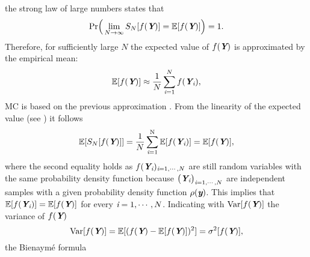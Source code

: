 the strong law of large numbers states that
\begin{equation}
\textrm{Pr}\Big(\lim_{N\rightarrow\infty}S_{N}[f(\textit{\textbf{Y}})] = \mathbb{E}[f(\textit{\textbf{Y}})] \Big) = 1.
\end{equation}
Therefore, for sufficiently large $N$ the expected value of $f(\textit{\textbf{Y}})$ is approximated by the empirical mean:
\begin{equation}\label{eq:approx_MC_QMC}
\mathbb{E}[f(\textit{\textbf{Y}})] \approx \frac{1}{N} \sum_{\textit{i}=1}^{N} f(\textit{\textbf{Y}}_{\textit{i}}),
\end{equation}
MC is based on the previous approximation \cite{owen2003quasi}. From the linearity of the expected value (see \cite{grinstead2012introduction})
 it follows
\begin{equation}\label{eq:linearity}
\mathbb{E}[S_{N}[f(\textit{\textbf{Y}})]] = \frac{1}{N}\sum_{\textit{i}=1}^{\textrm{N}}\mathbb{E}[f(\textit{\textbf{Y}}_{\textit{i}})] = \mathbb{E}[f(\textit{\textbf{Y}})],
\end{equation}
where the second equality holds as
$f(\textit{\textbf{Y}}_{\textit{i}})_{\textit{i}=1, \cdots, N}$ are still random variables with the same probability density function because $\big(\textit{\textbf{Y}}_{\textit{i}}\big)_{\textit{i}=1, \cdots, N}$ are independent samples 
with a given probability density function $\rho(\textit{\textbf{y}})$. This implies that $\mathbb{E}[f(\textit{\textbf{Y}}_{\textit{i}})] = \mathbb{E}[f(\textit{\textbf{Y}})]$ for every $\textit{i}=1, \cdots, N$. Indicating with $\textrm{Var}[f(\textit{\textbf{Y}})]$ the variance of $f(\textit{\textbf{Y}})$
\begin{equation}\textrm{Var}[f(\textit{\textbf{Y}})]=\mathbb{E}[(f(\textit{\textbf{Y}})-\mathbb{E}[f(\textit{\textbf{Y}})])^2] = \sigma^2[f(\textit{\textbf{Y}})],
\end{equation}
the Bienaym\'e formula
